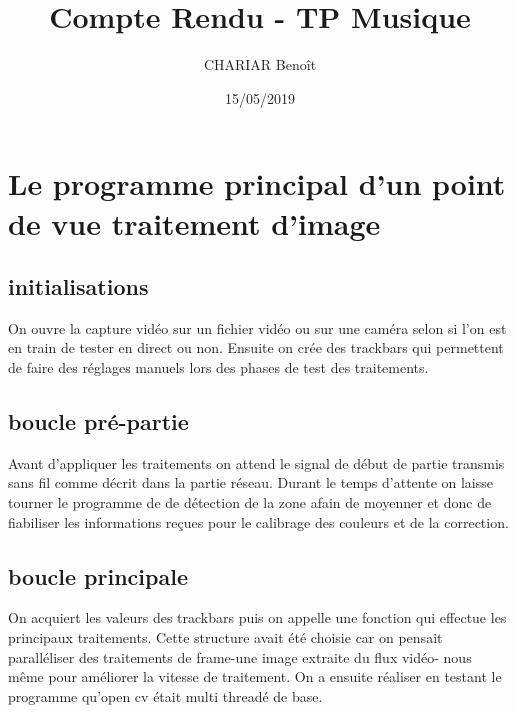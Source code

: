 \documentclass{article}
\title{Compte Rendu - TP Musique}
\author{
CHARIAR Benoît}
\date{15/05/2019}
\begin{document}
\maketitle

\section{Le programme principal d'un point de vue traitement d'image}

\subsection{initialisations}

On ouvre la capture vidéo sur un fichier vidéo ou sur une caméra selon si l'on est en train de tester en direct ou non. Ensuite on crée des trackbars qui permettent de faire des réglages manuels lors des phases de test des traitements.

\subsection{boucle pré-partie}

Avant d'appliquer les traitements on attend le signal de début de partie transmis sans fil comme décrit dans la partie réseau. Durant le temps d'attente on laisse tourner le programme de de détection de la zone afain de moyenner et donc de fiabiliser les informations reçues pour le calibrage des couleurs et de la correction.

\subsection{boucle principale}

On acquiert les valeurs des trackbars puis on appelle une fonction qui effectue les principaux traitements. Cette structure avait été choisie car on pensait paralléliser des traitements de frame-une image extraite du flux vidéo- nous même pour améliorer la vitesse de traitement. On a ensuite réaliser en testant le programme qu'open cv était multi threadé de base.
\end{document}
